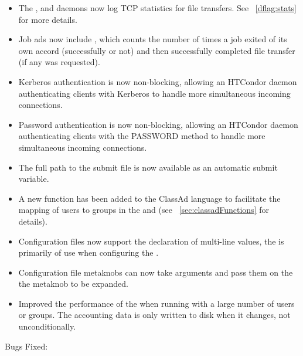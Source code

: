 \begin{itemize}
\item The ,  and  daemons
now log TCP statistics for file transfers.  See ~\ref{dflag:stats} for
more details.

\item Job ads now include , which counts the
number of times a job exited of its own accord (successfully or not) and
then successfully completed file transfer (if any was requested).

\item Kerberos authentication is now non-blocking, allowing an HTCondor
daemon authenticating clients with Kerberos to handle more simultaneous
incoming connections.

\item Password authentication is now non-blocking, allowing an HTCondor
daemon authenticating clients with the PASSWORD method to handle more
simultaneous incoming connections.

\item The full path to the submit file is now available as an automatic
submit variable.

\item A new function  has been added to the ClassAd language
to facilitate the mapping of users to groups in the  and
 (see ~\ref{sec:classadFunctions} for details).

\item Configuration files now support the declaration of multi-line values, the is primarily of use when
configuring the .

\item Configuration file metaknobs can now take arguments and pass them
on the the metaknob to be expanded.

\item Improved the performance of the  when running
with a large number of users or groups.  The accounting data is only
written to disk when it changes, not unconditionally.

\end{itemize}

\noindent Bugs Fixed:


